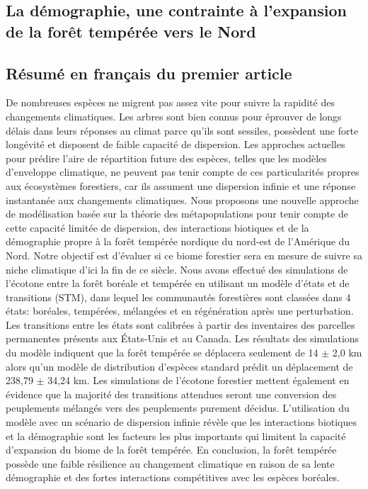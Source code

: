 \begin{spacing}{1.0}
\chapter{La démographie, une contrainte à l'expansion de la forêt tempérée vers le Nord}
\end{spacing}

\section{Résumé en français du premier article}

De nombreuses espèces ne migrent pas assez vite pour suivre la rapidité des changements climatiques.
Les arbres sont bien connus pour éprouver de longs délais dans leurs réponses au climat parce qu'ils
sont sessiles, possèdent une forte longévité et disposent de faible capacité de dispersion. Les
approches actuelles pour prédire l'aire de répartition future des espèces, telles que les modèles
d'enveloppe climatique, ne peuvent pas tenir compte de ces particularités propres aux écosystèmes
forestiers, car ils assument une dispersion infinie et une réponse instantanée aux changements
climatiques. Nous proposons une nouvelle approche de modélisation basée sur la théorie des
métapopulations pour tenir compte de cette capacité limitée de dispersion, des interactions
biotiques et de la démographie propre à la forêt tempérée nordique du nord-est de l'Amérique du
Nord. Notre objectif est d'évaluer si ce biome forestier sera en mesure de suivre sa niche
climatique d'ici la fin de ce siècle. Nous avons effectué des simulations de l'écotone entre la
forêt boréale et tempérée en utilisant un modèle d'états et de transitions (STM), dans lequel les
communautés forestières sont classées dans 4 états: boréales, tempérées, mélangées et en
régénération après une perturbation. Les transitions entre les états sont calibrées à partir des
inventaires des parcelles permanentes présents aux États-Unis et au Canada. Les résultats des
simulations du modèle indiquent que la forêt tempérée se déplacera seulement de 14 $\pm$ 2,0 km
alors qu'un modèle de distribution d'espèces standard prédit un déplacement de 238,79 $\pm$ 34,24
km. Les simulations de l'écotone forestier mettent également en évidence que la majorité des
transitions attendues seront une conversion des peuplements mélangés vers des peuplements purement
décidus. L'utilisation du modèle avec un scénario de dispersion infinie révèle que les interactions
biotiques et la démographie sont les facteurs les plus importants qui limitent la capacité
d'expansion du biome de la forêt tempérée. En conclusion, la forêt tempérée possède une faible
résilience au changement climatique en raison de sa lente démographie et des fortes interactions
compétitives avec les espèces boréales.

